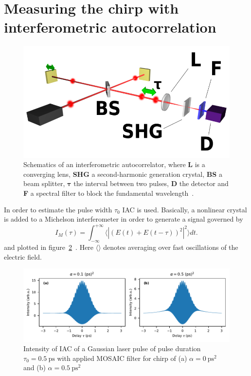 \section{Measuring the chirp with interferometric autocorrelation}
\begin{figure}[H]
	\centering
	\includegraphics[width=0.6\linewidth]{figures/chirp/Optical-interferometric-autocorrelation-setup.png}
	\caption[Schematics of an interferometric autocorrelator]{Schematics of an interferometric autocorrelator, where \textbf{L} is a converging lens, \textbf{SHG} a second-harmonic generation crystal, \textbf{BS} a beam splitter, $\mathbf{\tau}$ the interval between two pulses, \textbf{D} the detector and \textbf{F} a spectral filter to block the fundamental wavelength~\cite{noauthor_optical_nodate}.}
	\label{fig:optical-field-autocorrelation-setup}
\end{figure}
In order to estimate the pulse width $\tau_0$ \ac{IAC} is used.
Basically, a nonlinear crystal is added to a Michelson interferometer in order to generate a signal governed by
\begin{equation}
\label{eq:i-m-integral}
I_M(\tau) = \int_{-\infty}^{+\infty}\langle|(E(t)+E(t-\tau))^2|^2\rangle dt.
\end{equation}
and plotted in figure~\ref{fig:imgausschirpwithoutslitwithoutmosaic}~\cite{diels_ultrashort_2006}.
Here $\langle \rangle$ denotes averaging over fast oscillations of the electric field.
\begin{figure}[H]
	\centering
	\includegraphics[width=\linewidth]{figures/chirp/plots/I_M_gauss_chirp_without_slit_without_MOSAIC}
	\caption{Intensity of IAC of a Gaussian laser pulse of pulse duration $\tau_0=\SI{0.5}{\pico \second}$ with applied MOSAIC filter for chirp of (a) $\alpha = \SI{0}{\pico \second \squared}$ and (b) $\alpha = \SI{0.5}{\pico \second \squared}$}
	\label{fig:imgausschirpwithoutslitwithoutmosaic}
\end{figure}
